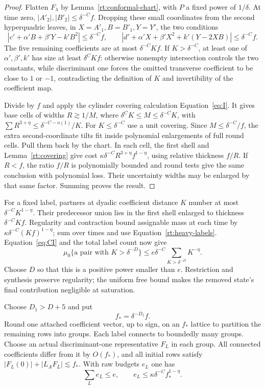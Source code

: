 \begin{proof}
Flatten $F_\lambda$ by Lemma~\ref{rt:conformal-chart}, with $P$ a fixed
power of $1/\delta$.  At time zero, $|A'_2|,|B'_2|\le\delta^{-C}f$.
Dropping these small coordinates from the second hyperquadric leaves,
in $X=A'_1,B=B'_1,Y=Y'$, the two conditions
\[
 |c'+\alpha'B+\beta'Y-k'B^2|\le\delta^{-C}f,\qquad
 |d'+\alpha'X+\beta'X^2+k'(Y-2XB)|\le\delta^{-C}f.
\]
The five remaining coefficients are at most $\delta^{-C}Kf$.
If $K>\delta^{-C}$, at least one of $\alpha',\beta',k'$ has size
at least $\delta^CKf$: otherwise nonempty intersection controls the
two constants, while discriminant one forces the omitted transverse
coefficient to be close to $1$ or $-1$, contradicting the definition
of $K$ and invertibility of the coefficient map.

Divide by $f$ and apply the cylinder covering calculation
Equation~\eqref{eq:I}.  It gives base cells of widths
$R\gtrsim1/M$, where $\delta^CK\le M\le\delta^{-C}K$, with
$\sum R^{3+\eta}\le\delta^{-C-o(1)}/K$.
For $K\le\delta^{-C}$ use a unit covering.  Since
$M\le\delta^{-C}/f$, the extra second-coordinate tilts fit inside
polynomial enlargements of full round cells.  Pull them back by the
chart.  In each cell, the first shell and Lemma~\ref{rt:covering} give
cost $\kappa\delta^{-C}R^{3+\eta}f^{1-\eta}$, using relative thickness
$f/R$.  If $R<f$, the ratio $f/R$ is polynomially bounded and round
tests give the same conclusion with polynomial loss.  Their uncertainty
widths may be enlarged by that same factor.  Summing proves the result.
\end{proof}

For a fixed label, partners at dyadic coefficient distance $K$ number
at most $\delta^{-C}K^{1-\eta}$.  Their predecessor union lies in the
first shell enlarged to thickness $\delta^{-C}Kf$.  Regularity and
contraction bound assignable mass at each time by
$\kappa\delta^{-C}(Kf)^{1-\eta}$; sum over times and use
Equation~\eqref{rt:heavy-labels}.  Equation~\eqref{eq:CI} and the total
label count now give
\[
 \mu_0\{\text{a pair with }K>\delta^{-D}\}
 \le e\delta^{-C}\sum_{K>\delta^{-D}}K^{-\eta}.
\]
Choose $D$ so that this is a positive power smaller than $e$.
Restriction and synthesis preserve regularity; the uniform free bound
makes the removed state's final contribution negligible at saturation.

Choose $D_1>D+5$ and put
\begin{equation}\label{rt:group-thickness}
 f_* =\delta^{-D_1}f.
\end{equation}
Round one attached coefficient vector, up to sign, on an $f_*$ lattice
to partition the remaining rows into groups.  Each label connects to
boundedly many groups.  Choose an actual discriminant-one representative
$F_L$ in each group.  All connected coefficients differ from it by
$O(f_*)$, and all initial rows satisfy
$|F_L(0)|+|L_AF_L|\lesssim f_*$.
With raw budgets $e_L$ one has
\begin{equation}\label{rt:group-budgets}
 \sum_L e_L\le e,\qquad
 e_L\le\kappa\delta^{-C}f_*^{1-\eta}.
\end{equation}

